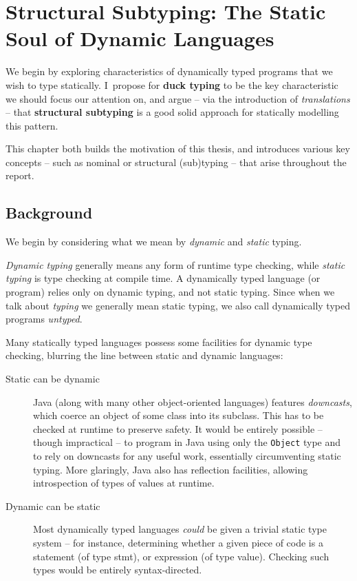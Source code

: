 \chapter
    [Structural Subtyping: The Static Soul of Dynamic Languages]
    {Structural Subtyping: \newline The Static Soul of Dynamic Languages}
\label{static-soul}

We begin by exploring characteristics of dynamically typed programs that we wish to type statically. I~propose for \textbf{duck typing} to be the key characteristic we should focus our attention on, and argue -- via the introduction of \emph{translations} -- that \textbf{structural subtyping} is a good solid approach for statically modelling this pattern.

This chapter both builds the motivation of this thesis, and introduces various key concepts -- such as nominal or structural (sub)typing -- that arise throughout the report.

\section{Background}
\label{sec:background}

We begin by considering what we mean by \emph{dynamic} and \emph{static} typing.

\emph{Dynamic typing} generally means any form of runtime type checking, while \emph{static typing} is type checking at compile time. A dynamically typed language (or program) relies only on dynamic typing, and not static typing. Since when we talk about \emph{typing} we generally mean static typing, we also call dynamically typed programs \emph{untyped}. 

Many statically typed languages possess some facilities for dynamic type checking, blurring the line between static and dynamic languages: \begin{description}
    \item[Static can be dynamic] Java (along with many other object-oriented languages) features \textit{downcasts}, which coerce an object of some class into its subclass. This has to be checked at runtime to preserve safety. It would be entirely possible -- though impractical -- to program in Java using only the \texttt{Object} type and to rely on downcasts for any useful work, essentially circumventing static typing. More glaringly, Java also has reflection facilities, allowing introspection of types of values at runtime. 
    \item[Dynamic can be static] Most dynamically typed languages \emph{could} be given a trivial static type system -- for instance, determining whether a given piece of code is a statement (of type \textsf{stmt}), or expression (of type \textsf{value}). Checking such types would be entirely syntax-directed.
\end{description} 

